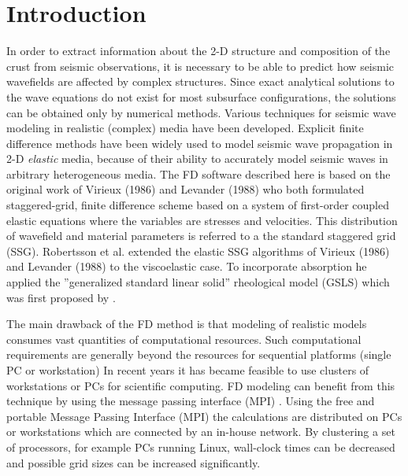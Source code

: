 \documentclass[11pt,onecolumn,oneside]{article}
\begin{document}
\section{Introduction}
In order to extract information about the 2-D structure and composition of the crust from seismic observations, it is necessary to be able to predict how seismic wavefields are affected by complex structures. Since exact analytical solutions to the wave equations do not exist for most subsurface configurations, the solutions can be obtained only  by numerical methods. Various techniques for seismic wave modeling in realistic (complex)  media have been developed. Explicit finite difference methods have been widely used to model seismic wave propagation in 2-D {\em elastic} media, because of their ability to accurately model seismic waves in arbitrary heterogeneous media. The FD software described here is based on the original work of Virieux (1986) and Levander (1988) who both formulated staggered-grid, finite difference scheme based on a system \nocite{levander:88} \nocite{virieux:86} of first-order coupled elastic equations where the variables are stresses  and velocities. This distribution of wavefield and material parameters is referred to a the standard staggered grid (SSG). Robertsson et al.  extended the elastic SSG algorithms of Virieux (1986) and Levander (1988) to the viscoelastic case. To incorporate absorption he applied the ''generalized standard linear solid'' rheological model  (GSLS) which was first proposed by \cite{emmerich:87}.

The main drawback of the FD method is that modeling of realistic models consumes vast quantities of computational resources. Such computational requirements are generally beyond the resources for sequential platforms (single PC or workstation) In recent years it has became feasible to use clusters of workstations or PCs for scientific computing.  FD modeling can benefit from this
technique by using  the message passing interface (MPI) \cite{bohlen:02}. Using the free and portable Message Passing Interface (MPI) the calculations are distributed on PCs or workstations which are connected by an in-house network. By clustering a set of processors, for example PCs running Linux, wall-clock times can be decreased and possible grid sizes  can be increased significantly. 
\clearpage
\end{document}
